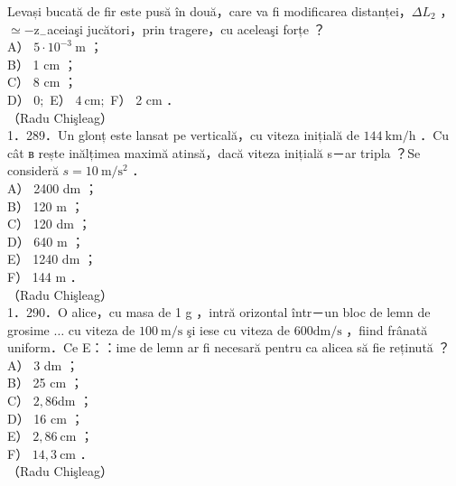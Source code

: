 \documentclass[10pt]{article}
\begin{document}
Levași bucată de fir este pusă în două，care va fi modificarea distanței，$\Delta L_{2}$ ， $\simeq-\mathrm{z}_{-}$aceiaşi jucători，prin tragere，cu aceleaşi forțe ？\\
A） $5 \cdot 10^{-3} \mathrm{~m}$ ；\\
B） 1 cm ；\\
C） 8 cm ；\\
D） $0 ;$ E） $4 \mathrm{~cm} ;$ F） 2 cm ．\\
（Radu Chişleag）\\
1．289．Un glonț este lansat pe verticală，cu viteza inițială de $144 \mathrm{~km} / \mathrm{h}$ ．Cu cât в rește inălțimea maximă atinsă，dacă viteza inițială s－ar tripla ？Se consideră $s=10 \mathrm{~m} / \mathrm{s}^{2}$ ．\\
A） 2400 dm ；\\
B） 120 m ；\\
C） 120 dm ；\\
D） 640 m ；\\
E） 1240 dm ；\\
F） 144 m ．\\
（Radu Chişleag）\\
1．290．O alice，cu masa de 1 g ，intră orizontal într－un bloc de lemn de grosime $\ldots$ cu viteza de $100 \mathrm{~m} / \mathrm{s}$ şi iese cu viteza de $600 \mathrm{dm} / \mathrm{s}$ ，fiind frânată uniform．Ce E：：ime de lemn ar fi necesară pentru ca alicea să fie reținută ？\\
A） 3 dm ；\\
B） 25 cm ；\\
C） $2,86 \mathrm{dm}$ ；\\
D） 16 cm ；\\
E） $2,86 \mathrm{~cm}$ ；\\
F） $14,3 \mathrm{~cm}$ ．\\
（Radu Chişleag）
\end{document}

